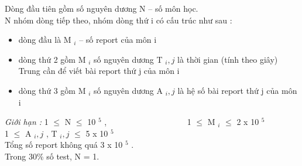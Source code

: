 Dòng đầu tiên gồm số nguyên dương N – số môn học.
\\N nhóm dòng tiếp theo, nhóm dòng thứ i có cấu trúc như sau :
\begin{itemize}
	\item dòng đầu là M $_ i $ – số report của môn i
	\item dòng thứ 2 gồm M $_ i $ số nguyên dương T $_ i,j $ là thời gian (tính theo giây) Trung cần để viết bài report thứ j của môn i
	\item dòng thứ 3 gồm M $_ i $ số nguyên dương A $_ i,j $ là hệ số bài report thứ j của môn i
\end{itemize}

\emph{Giới hạn : } 1  $\le$  N  $\le$  10 $^ 5 $ ,                    1  $\le$  M $_ i $  $\le$  2 x 10 $^ 5 $
\\1  $\le$  A $_ i,j $ , T $_ i,j $  $\le$  5 x 10 $^ 5 $
\\Tổng số report không quá 3 x 10 $^ 5 $ .
\\Trong 30\% số test, N = 1.

\